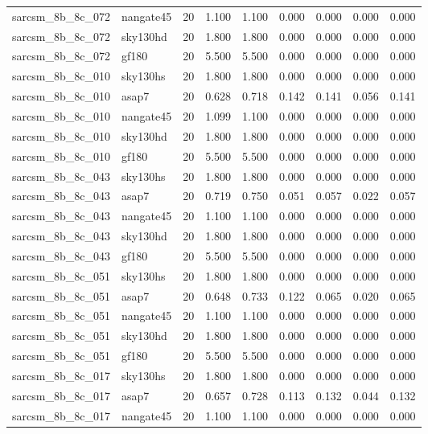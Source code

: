 \begin{tabular}{llrrrrrrr}
sarcsm\_8b\_8c\_072 & nangate45 & 20 & 1.100 & 1.100 & 0.000 & 0.000 & 0.000 & 0.000 \\
sarcsm\_8b\_8c\_072 & sky130hd & 20 & 1.800 & 1.800 & 0.000 & 0.000 & 0.000 & 0.000 \\
sarcsm\_8b\_8c\_072 & gf180 & 20 & 5.500 & 5.500 & 0.000 & 0.000 & 0.000 & 0.000 \\
sarcsm\_8b\_8c\_010 & sky130hs & 20 & 1.800 & 1.800 & 0.000 & 0.000 & 0.000 & 0.000 \\
sarcsm\_8b\_8c\_010 & asap7 & 20 & 0.628 & 0.718 & 0.142 & 0.141 & 0.056 & 0.141 \\
sarcsm\_8b\_8c\_010 & nangate45 & 20 & 1.099 & 1.100 & 0.000 & 0.000 & 0.000 & 0.000 \\
sarcsm\_8b\_8c\_010 & sky130hd & 20 & 1.800 & 1.800 & 0.000 & 0.000 & 0.000 & 0.000 \\
sarcsm\_8b\_8c\_010 & gf180 & 20 & 5.500 & 5.500 & 0.000 & 0.000 & 0.000 & 0.000 \\
sarcsm\_8b\_8c\_043 & sky130hs & 20 & 1.800 & 1.800 & 0.000 & 0.000 & 0.000 & 0.000 \\
sarcsm\_8b\_8c\_043 & asap7 & 20 & 0.719 & 0.750 & 0.051 & 0.057 & 0.022 & 0.057 \\
sarcsm\_8b\_8c\_043 & nangate45 & 20 & 1.100 & 1.100 & 0.000 & 0.000 & 0.000 & 0.000 \\
sarcsm\_8b\_8c\_043 & sky130hd & 20 & 1.800 & 1.800 & 0.000 & 0.000 & 0.000 & 0.000 \\
sarcsm\_8b\_8c\_043 & gf180 & 20 & 5.500 & 5.500 & 0.000 & 0.000 & 0.000 & 0.000 \\
sarcsm\_8b\_8c\_051 & sky130hs & 20 & 1.800 & 1.800 & 0.000 & 0.000 & 0.000 & 0.000 \\
sarcsm\_8b\_8c\_051 & asap7 & 20 & 0.648 & 0.733 & 0.122 & 0.065 & 0.020 & 0.065 \\
sarcsm\_8b\_8c\_051 & nangate45 & 20 & 1.100 & 1.100 & 0.000 & 0.000 & 0.000 & 0.000 \\
sarcsm\_8b\_8c\_051 & sky130hd & 20 & 1.800 & 1.800 & 0.000 & 0.000 & 0.000 & 0.000 \\
sarcsm\_8b\_8c\_051 & gf180 & 20 & 5.500 & 5.500 & 0.000 & 0.000 & 0.000 & 0.000 \\
sarcsm\_8b\_8c\_017 & sky130hs & 20 & 1.800 & 1.800 & 0.000 & 0.000 & 0.000 & 0.000 \\
sarcsm\_8b\_8c\_017 & asap7 & 20 & 0.657 & 0.728 & 0.113 & 0.132 & 0.044 & 0.132 \\
sarcsm\_8b\_8c\_017 & nangate45 & 20 & 1.100 & 1.100 & 0.000 & 0.000 & 0.000 & 0.000 \\

\end{tabular}
